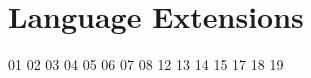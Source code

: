 \section{Language Extensions}
{01}
{02}
{03}
{04}
{05}
{06}
{07}
{08}
{12}
{13}
{14}
{15}
{17}
{18}
{19}
